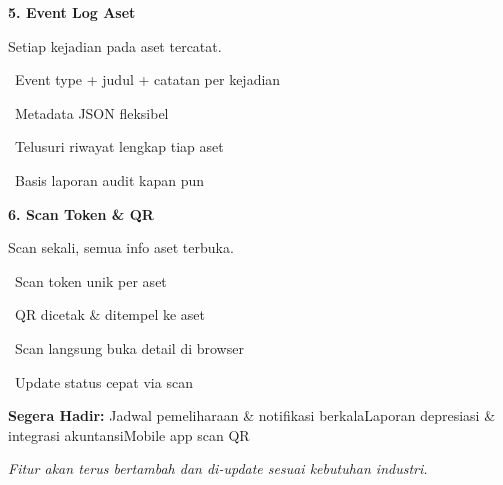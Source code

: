 \documentclass[a4paper]{article}
\begin{document}
\noindent
\begin{minipage}[t]{0.485\textwidth}
    \colorbox{OrangePrimary}{%
        \begin{minipage}{\dimexpr\textwidth-2\fboxsep\relax}
            {\fontsize{10}{13}\selectfont\bfseries\color{White} 5. Event Log Aset}
        \end{minipage}}\par
    \vspace{4pt}
    {\fontsize{9}{12}\selectfont\color{TextDark}%
    Setiap kejadian pada aset tercatat.\par\vspace{3pt}
    \textbullet\ Event type + judul + catatan per kejadian\par\vspace{2pt}%
    \textbullet\ Metadata JSON fleksibel\par\vspace{2pt}%
    \textbullet\ Telusuri riwayat lengkap tiap aset\par\vspace{2pt}%
    \textbullet\ Basis laporan audit kapan pun}%
\end{minipage}%
\hfill
\begin{minipage}[t]{0.485\textwidth}
    \colorbox{EmeraldDark}{%
        \begin{minipage}{\dimexpr\textwidth-2\fboxsep\relax}
            {\fontsize{10}{13}\selectfont\bfseries\color{White} 6. Scan Token \& QR}
        \end{minipage}}\par
    \vspace{4pt}
    {\fontsize{9}{12}\selectfont\color{TextDark}%
    Scan sekali, semua info aset terbuka.\par\vspace{3pt}
    \textbullet\ Scan token unik per aset\par\vspace{2pt}%
    \textbullet\ QR dicetak \& ditempel ke aset\par\vspace{2pt}%
    \textbullet\ Scan langsung buka detail di browser\par\vspace{2pt}%
    \textbullet\ Update status cepat via scan}%
\end{minipage}

\vspace{8pt}

{\setlength{\fboxsep}{8pt}\setlength{\fboxrule}{0pt}%
\noindent\colorbox{BlueBg}{%
    \begin{minipage}{\dimexpr\textwidth-2\fboxsep\relax}
        {\fontsize{9}{12}\selectfont\bfseries\color{BlueDark} Segera Hadir:}\enspace
        {\fontsize{9}{12}\selectfont\color{TextDark} Jadwal pemeliharaan \& notifikasi berkala\enspace\textcolor{BluePrimary}{\textbullet}\enspace Laporan depresiasi \& integrasi akuntansi\enspace\textcolor{BluePrimary}{\textbullet}\enspace Mobile app scan QR}\par\vspace{3pt}
        {\fontsize{8.5}{11}\selectfont\color{TextLight}\textit{Fitur akan terus bertambah dan di-update sesuai kebutuhan industri.}}
    \end{minipage}}}
\end{document}
